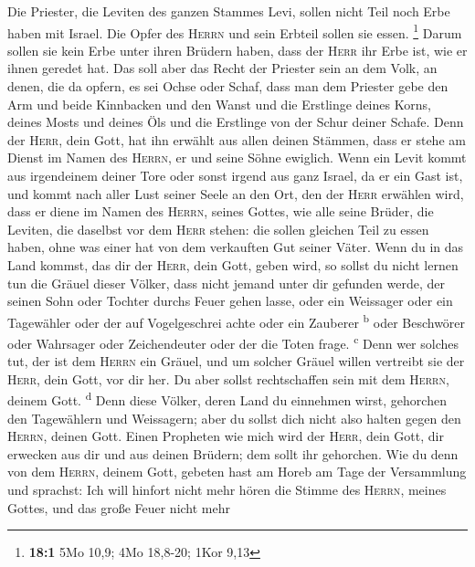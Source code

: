  Die Priester, die Leviten des ganzen Stammes Levi, sollen
nicht Teil noch Erbe haben mit Israel. Die Opfer des \textsc{Herrn} und
sein Erbteil sollen sie essen. \footnote{\textbf{18:1} 5Mo 10,9; 4Mo
  18,8-20; 1Kor 9,13}  Darum sollen sie kein Erbe unter
ihren Brüdern haben, dass der \textsc{Herr} ihr Erbe ist, wie er ihnen
geredet hat.  Das soll aber das Recht der Priester sein an
dem Volk, an denen, die da opfern, es sei Ochse oder Schaf, dass man dem
Priester gebe den Arm und beide Kinnbacken und den Wanst 
und die Erstlinge deines Korns, deines Mosts und deines Öls und die
Erstlinge von der Schur deiner Schafe.  Denn der
\textsc{Herr}, dein Gott, hat ihn erwählt aus allen deinen Stämmen, dass
er stehe am Dienst im Namen des \textsc{Herrn}, er und seine Söhne
ewiglich.  Wenn ein Levit kommt aus irgendeinem deiner
Tore oder sonst irgend aus ganz Israel, da er ein Gast ist, und kommt
nach aller Lust seiner Seele an den Ort, den der \textsc{Herr} erwählen
wird,  dass er diene im Namen des \textsc{Herrn}, seines
Gottes, wie alle seine Brüder, die Leviten, die daselbst vor dem
\textsc{Herr} stehen:  die sollen gleichen Teil zu essen
haben, ohne was einer hat von dem verkauften Gut seiner Väter.
 Wenn du in das Land kommst, das dir der \textsc{Herr},
dein Gott, geben wird, so sollst du nicht lernen tun die Gräuel dieser
Völker,  dass nicht jemand unter dir gefunden werde, der
seinen Sohn oder Tochter durchs Feuer gehen lasse, oder ein Weissager
oder ein Tagewähler oder der auf Vogelgeschrei achte oder ein Zauberer
\textsuperscript{b}  oder Beschwörer oder Wahrsager oder
Zeichendeuter oder der die Toten frage. \textsuperscript{c}
 Denn wer solches tut, der ist dem \textsc{Herrn} ein
Gräuel, und um solcher Gräuel willen vertreibt sie der \textsc{Herr},
dein Gott, vor dir her.  Du aber sollst rechtschaffen
sein mit dem \textsc{Herrn}, deinem Gott. \textsuperscript{d}
 Denn diese Völker, deren Land du einnehmen wirst,
gehorchen den Tagewählern und Weissagern; aber du sollst dich nicht also
halten gegen den \textsc{Herrn}, deinen Gott.  Einen
Propheten wie mich wird der \textsc{Herr}, dein Gott, dir erwecken aus
dir und aus deinen Brüdern; dem sollt ihr gehorchen.  Wie
du denn von dem \textsc{Herrn}, deinem Gott, gebeten hast am Horeb am
Tage der Versammlung und sprachst: Ich will hinfort nicht mehr hören die
Stimme des \textsc{Herrn}, meines Gottes, und das große Feuer nicht mehr
